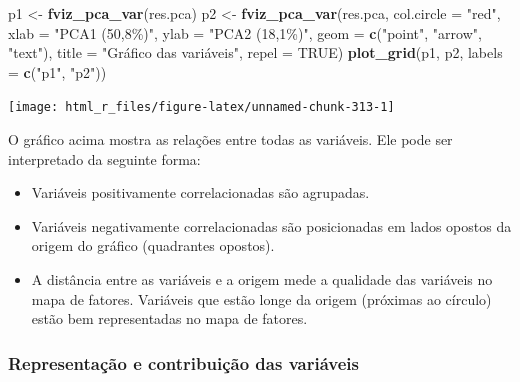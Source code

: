 \documentclass[
]{book}
\newenvironment{Shaded}{\begin{snugshade}}{\end{snugshade}}
\newcommand{\DataTypeTok}[1]{\textcolor[rgb]{0.13,0.29,0.53}{#1}}
\newcommand{\KeywordTok}[1]{\textcolor[rgb]{0.13,0.29,0.53}{\textbf{#1}}}
\newcommand{\NormalTok}[1]{#1}
\newcommand{\OtherTok}[1]{\textcolor[rgb]{0.56,0.35,0.01}{#1}}
\newcommand{\StringTok}[1]{\textcolor[rgb]{0.31,0.60,0.02}{#1}}
\providecommand{\tightlist}{%
  \setlength{\itemsep}{0pt}\setlength{\parskip}{0pt}}
\numberwithin{equation}{section}
\begin{document}
\begin{Shaded}
\begin{Highlighting}[]
\NormalTok{p1 \textless{}{-}}\StringTok{ }\KeywordTok{fviz\_pca\_var}\NormalTok{(res.pca)}
\NormalTok{p2 \textless{}{-}}\StringTok{ }\KeywordTok{fviz\_pca\_var}\NormalTok{(res.pca,}
                   \DataTypeTok{col.circle =} \StringTok{"red"}\NormalTok{,}
                   \DataTypeTok{xlab =} \StringTok{"PCA1 (50,8\%)"}\NormalTok{,}
                   \DataTypeTok{ylab =} \StringTok{"PCA2 (18,1\%)"}\NormalTok{,}
                   \DataTypeTok{geom =} \KeywordTok{c}\NormalTok{(}\StringTok{"point"}\NormalTok{, }\StringTok{"arrow"}\NormalTok{, }\StringTok{"text"}\NormalTok{),}
                   \DataTypeTok{title =} \StringTok{"Gráfico das variáveis"}\NormalTok{,}
                   \DataTypeTok{repel =} \OtherTok{TRUE}\NormalTok{)}
\KeywordTok{plot\_grid}\NormalTok{(p1, p2, }\DataTypeTok{labels =} \KeywordTok{c}\NormalTok{(}\StringTok{"p1"}\NormalTok{, }\StringTok{"p2"}\NormalTok{))}
\end{Highlighting}
\end{Shaded}

\begin{center}\texttt{[image: html\_r\_files/figure-latex/unnamed-chunk-313-1]} \end{center}

O gráfico acima mostra as relações entre todas as variáveis. Ele pode ser interpretado da seguinte forma:

\begin{itemize}
\tightlist
\item
  Variáveis positivamente correlacionadas são agrupadas.
\item
  Variáveis negativamente correlacionadas são posicionadas em lados opostos da origem do gráfico (quadrantes opostos).
\item
  A distância entre as variáveis e a origem mede a qualidade das variáveis no mapa de fatores. Variáveis que estão longe da origem (próximas ao círculo) estão bem representadas no mapa de fatores.
\end{itemize}

\hypertarget{representauxe7uxe3o-e-contribuiuxe7uxe3o-das-variuxe1veis}{%
\subsubsection{Representação e contribuição das variáveis}\label{representauxe7uxe3o-e-contribuiuxe7uxe3o-das-variuxe1veis}}
\end{document}
